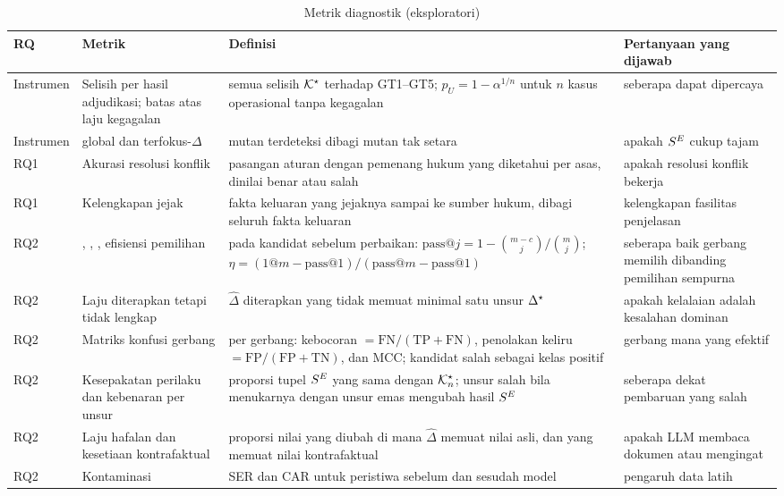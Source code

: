 \begin{table}[t]
\centering
\caption{Metrik diagnostik (eksploratori)}
\label{tab:diagnostik}
\scriptsize
\begin{tabularx}{\textwidth}{@{}P{1.2cm} P{3.3cm} L P{3.6cm}@{}}
\toprule
\textbf{RQ} & \textbf{Metrik} & \textbf{Definisi} & \textbf{Pertanyaan yang dijawab} \\
\midrule
Instrumen & Selisih per hasil adjudikasi; batas atas laju kegagalan & semua selisih $\mathcal{K}^{\star}$ terhadap GT1--GT5; $p_U = 1-\alpha^{1/n}$ untuk $n$ kasus operasional tanpa kegagalan & seberapa dapat dipercaya  \\
Instrumen &  global dan terfokus-$\Delta$ & mutan terdeteksi dibagi mutan tak setara & apakah $S^{E}$ cukup tajam \\
RQ1 & Akurasi resolusi konflik & pasangan aturan dengan pemenang hukum yang diketahui per asas, dinilai benar atau salah & apakah resolusi konflik bekerja \\
RQ1 & Kelengkapan jejak & fakta keluaran yang jejaknya sampai ke sumber hukum, dibagi seluruh fakta keluaran & kelengkapan fasilitas penjelasan \\
\midrule
RQ2 & , , , efisiensi pemilihan & pada kandidat sebelum perbaikan: $\text{pass@}j = 1-\binom{m-c}{j}/\binom{m}{j}$; $\eta = (\text{1@}m - \text{pass@}1)/(\text{pass@}m - \text{pass@}1)$ & seberapa baik gerbang memilih dibanding pemilihan sempurna \\
RQ2 & Laju diterapkan tetapi tidak lengkap & $\hat{\Delta}$ diterapkan yang tidak memuat minimal satu unsur $\Delta^{\star}$ & apakah kelalaian adalah kesalahan dominan \\
RQ2 & Matriks konfusi gerbang & per gerbang: kebocoran $=\mathrm{FN}/(\mathrm{TP}+\mathrm{FN})$, penolakan keliru $=\mathrm{FP}/(\mathrm{FP}+\mathrm{TN})$, dan MCC; kandidat salah sebagai kelas positif & gerbang mana yang efektif \\
RQ2 & Kesepakatan perilaku dan kebenaran per unsur & proporsi tupel $S^{E}$ yang sama dengan $\mathcal{K}^{\star}_n$; unsur salah bila menukarnya dengan unsur emas mengubah hasil $S^{E}$ & seberapa dekat pembaruan yang salah \\
RQ2 & Laju hafalan dan kesetiaan kontrafaktual & proporsi nilai yang diubah di mana $\hat{\Delta}$ memuat nilai asli, dan yang memuat nilai kontrafaktual & apakah LLM membaca dokumen atau mengingat \\
RQ2 & Kontaminasi & SER dan CAR untuk peristiwa sebelum dan sesudah  model & pengaruh data latih \\

\end{tabularx}
\end{table}
